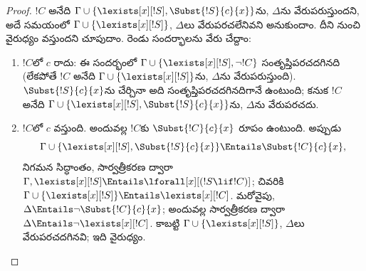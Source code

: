 \documentclass[../../../include/open-logic-section]{subfiles}
\begin{document}
\begin{proof}
$!C$ అనేది $\Gamma \cup \{\lexists[x][!S], \Subst{!S}{c}{x}\}$ను,
$\Delta$ను వేరుపరుస్తుందని, అదే సమయంలో
$\Gamma \cup \{\lexists[x][!S] \}$, $\Delta$లు వేరుపరచలేనివని
అనుకుందాం. దీని నుంచి వైరుధ్యం వస్తుందని చూపుదాం.
రెండు సందర్భాలను వేరు చేద్దాం:
\begin{enumerate}
\item $!C$లో $c$ రాదు: ఈ సందర్భంలో $\Gamma \cup
  \{\lexists[x][!S], \lnot!C \}$ సంతృప్తిపరచదగినది (లేకపోతే $!C$ అనేది
  $\Gamma \cup \{\lexists[x][!S] \}$ను, $\Delta$ను వేరుపరుస్తుంది).
  $\Subst{!S}{c}{x}$ను చేర్చినా అది సంతృప్తిపరచదగినదిగానే ఉంటుంది;
  కనుక $!C$ అనేది $\Gamma \cup \{ \lexists[x][!S],
  \Subst{!S}{c}{x} \}$ను, $\Delta$ను వేరుపరచదు.
\item $!C$లో $c$ వస్తుంది. అందువల్ల $!C$కు
  $\Subst{!C}{c}{x}$ రూపం ఉంటుంది. అప్పుడు
  \[
  \Gamma \cup \{ \lexists[x][!S], \Subst{!S}{c}{x}\} \Entails \Subst{!C}{c}{x},
  \]
  నిగమన సిద్ధాంతం, సార్వత్రీకరణ ద్వారా
  $\Gamma, \lexists[x][!S] \Entails \lforall[x][(!S \lif !C)]$;
  చివరికి $\Gamma \cup \{ \lexists[x][!S] \} \Entails
  \lexists[x][!C]$. మరోవైపు,
  $\Delta \Entails \lnot \Subst{!C}{c}{x}$; అందువల్ల సార్వత్రీకరణ
  ద్వారా $\Delta \Entails \lnot \lexists[x][!C]$. కాబట్టి
  $\Gamma \cup \{\lexists[x][!S] \}$, $\Delta$లు వేరుపరచదగినవి;
  ఇది వైరుధ్యం.
\end{enumerate}
\end{proof}
\end{document}
